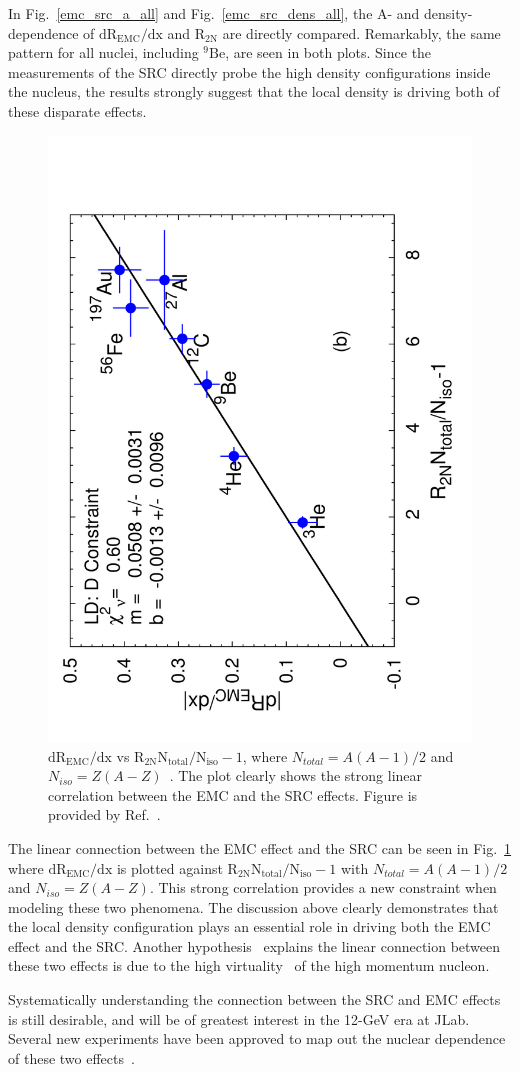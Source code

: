   In Fig.~\ref{emc_src_a_all} and Fig.~\ref{emc_src_dens_all}, the A- and density-dependence of $\mathrm{dR_{EMC}/dx}$ and $\mathrm{R_{2N}}$ are directly compared. Remarkably, the same pattern for all nuclei, including $\mathrm{^{9}Be}$, are seen in both plots. Since the measurements of the SRC directly probe the high density configurations inside the nucleus, the results strongly suggest that the local density is driving both of these disparate effects. 
  
    \begin{figure}[!ht]
  \begin{center}
    \includegraphics[type=pdf,ext=.pdf,read=.pdf,angle=270,width=0.60\linewidth]{./figures/physics/emc_vs_src_plotfit}
   \caption[$\mathrm{dR_{EMC}/dx}$ vs $\mathrm{R_{2N}}$]{\footnotesize{$\mathrm{dR_{EMC}/dx}$ vs $\mathrm{R_{2N} N_{total}/N_{iso}-1}$, where $N_{total}=A(A-1)/2$ and $N_{iso}=Z(A-Z)$~\cite{john_src_emc}. The plot clearly shows the strong linear correlation between the EMC and the SRC effects. Figure is provided by Ref.~\cite{john_src_emc}.}}
    \label{emc_vs_src}
  \end{center}
\end{figure} 
 The linear connection between the EMC effect and the SRC can be seen in Fig.~\ref{emc_vs_src} where $\mathrm{dR_{EMC}/dx}$ is plotted against $\mathrm{R_{2N}N_{total}/N_{iso}-1}$ with $N_{total}=A(A-1)/2$ and $N_{iso}=Z(A-Z)$. This strong correlation provides a new constraint when modeling these two phenomena. The discussion above clearly demonstrates that the local density configuration plays an essential role in driving both the EMC effect and the SRC. Another hypothesis~\cite{PhysRevLett.106.052301} explains the linear connection between these two effects is due to the high virtuality~\cite{M_Sargsian_JPG_29_2003} of the high momentum nucleon. 
  
 Systematically understanding the connection between the SRC and EMC effects is still desirable, and will be of greatest interest in the 12-GeV era at JLab. Several new experiments have been approved to map out the nuclear dependence of these two effects~\cite{E12_10_103_pr,E12_06_105_pr,E12_10_008_pr,E12_11_107_pr,E12_10_003_pr}.
